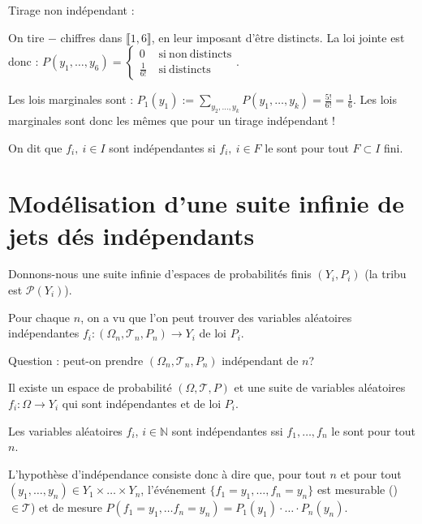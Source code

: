 \documentclass[10pt,a4paper,notitlepage ]{report}
\begin{document}
\begin{exemple}
	Tirage non indépendant :
	
	On tire $-$ chiffres dans $\llbracket 1,6 \rrbracket$, en leur imposant d'être distincts. La loi jointe est donc : $P(y_1, \dots, y_6) = \begin{cases}
		0 &\mathrm{\ si\  non\  distincts} \\
		\frac{1}{6!} &\mathrm{\ si\ distincts}
	\end{cases}$.

	Les lois marginales sont : $P_1(y_1):= \underset{y_2,\dots,y_k}{\sum} P(y_1,\dots,y_k) = \frac{5!}{6!} = \frac{1}{6}$. Les lois marginales sont donc les mêmes que pour un tirage indépendant !
\end{exemple}
\begin{definition}
	On dit que $f_i,\ i\in I$ sont indépendantes si $f_i,\ i\in F$ le sont pour tout $F\subset I$ fini.
\end{definition}

\section{Modélisation d'une suite infinie de jets dés indépendants}

Donnons-nous une suite infinie d'espaces de probabilités finis $(Y_i,P_i)$ (la tribu est $\mathcal P(Y_i)$).

Pour chaque $n$, on a vu que l'on peut trouver des variables aléatoires indépendantes $f_i:(\Omega_n,\mathcal T_n, P_n) \rightarrow Y_i$ de loi $P_i$.

Question : peut-on prendre $(\Omega_n,\mathcal T_n, P_n)$ indépendant de $n$?

\begin{theorem}
	Il existe un espace de probabilité $(\Omega,\mathcal T, P)$ et une suite de variables aléatoires $f_i : \Omega \rightarrow Y_i$ qui sont indépendantes et de loi $P_i$.
\end{theorem}

\begin{rem}
	Les variables aléatoires $f_i$, $i\in \mathbb N$ sont indépendantes ssi $f_1, \dots, f_n$ le sont pour tout $n$.
\end{rem}

L'hypothèse d'indépendance consiste donc à dire que, pour tout $n$ et pour tout $(y_1, \dots, y_n) \in Y_1 \times \dots \times Y_n$, l'événement $\{f_1=y_1,\dots,f_n=y_n\}$ est mesurable ()$\in\mathcal T$) et de mesure $P(f_1=y_1, \dots f_n=y_n) = P_1(y_1)\cdot\dots\cdot P_n(y_n)$.
\end{document}
